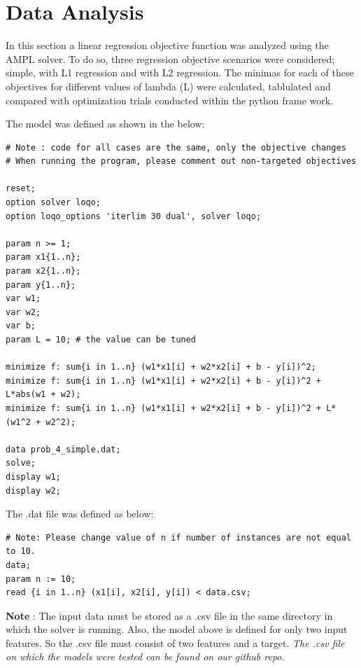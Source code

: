 \section{Data Analysis}

In this section a linear regression objective function was analyzed using the AMPL solver.  To do so, three regression objective scenarios were considered; simple, with L1 regression and with L2 regression. The minimas for each of these objectives for different values of lambda (L) were calculated, tablulated and compared with optimization trials conducted within the python frame work.  \newline 

\noindent
The model was defined as shown in the below:

\begin{verbatim}
# Note : code for all cases are the same, only the objective changes
# When running the program, please comment out non-targeted objectives 

reset;
option solver loqo;
option loqo_options 'iterlim 30 dual', solver loqo;

param n >= 1;
param x1{1..n};
param x2{1..n};
param y{1..n};
var w1;
var w2;
var b;
param L = 10; # the value can be tuned

minimize f: sum{i in 1..n} (w1*x1[i] + w2*x2[i] + b - y[i])^2;
minimize f: sum{i in 1..n} (w1*x1[i] + w2*x2[i] + b - y[i])^2 + L*abs(w1 + w2);
minimize f: sum{i in 1..n} (w1*x1[i] + w2*x2[i] + b - y[i])^2 + L*(w1^2 + w2^2);

data prob_4_simple.dat;
solve;
display w1;
display w2;
\end{verbatim}

\newpage
\noindent
The .dat file was defined as below:

\begin{verbatim}
# Note: Please change value of n if number of instances are not equal to 10. 
data;
param n := 10;
read {i in 1..n} (x1[i], x2[i], y[i]) < data.csv; 
\end{verbatim}


\textbf{Note} : The input data must be stored as a .csv file in the same directory in which the solver is running. Also, the model above is defined for only two input features. So the .csv file must consist of two features and a target. \newline
\textit{The .csv file on which the models were tested can be found on our github repo.} \newline
 



